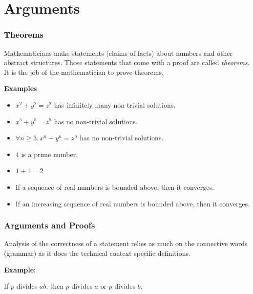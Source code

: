\documentclass{beamer}
\begin{document}
\section{Arguments}

\begin{frame}
	\frametitle{Theorems}


	Mathematicians make statements (claims of facts) about numbers and other abstract structures. Those statements that come with a proof are called \emph{theorems}. It is the job of the mathematician to prove theorems.

	\textbf{Examples}

		\begin{itemize}
			\item[] $x^{2} + y^{2} = z^{2}$ has infinitely many non-trivial solutions.
			\item[] $x^{5} + y^{5} = z^{5}$ has no non-trivial solutions.
			\item[] $\forall n \geq 3, x^{n} + y^{n} = z^{n}$ has no non-trivial solutions.
			\item[] $4$ is a prime number.
			\item[] $1 + 1 = 2$
			\item[] If a sequence of real numbers is bounded above, then it converges.
			\item[] If an increasing sequence of real numbers is bounded above, then it converges.
		\end{itemize}

\end{frame}

\begin{frame}
  \frametitle{Arguments and Proofs}

	Analysis of the correctness of a statement relies as much on the connective words (grammar) as it does the technical context specific definitions. 

\vspace{5mm}

{\bf Example: }
 
If $p$ divides $ab$, then $p$ divides $a$ or $p$ divides $b$.
  
\vspace{4cm}


\end{frame}
\end{document}
